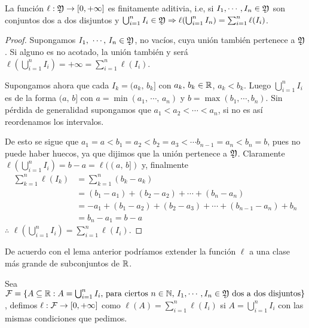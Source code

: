 \begin{lemma}
    La función $\ell : \mathfrak{Y} \to [0, +\infty]$ es finitamente aditivia, i.e, si $I_1, \cdots, I_n \in \mathfrak{Y}$ son conjuntos dos a dos disjuntos y
    $\bigcup_{i = 1}^n I_i \in \mathfrak{Y} \Rightarrow \ell(\bigcup_{i = 1}^n I_n) = \sum_{i = 1}^n \ell(I_i)$.
    \begin{proof}
        Supongamos $I_1\text{, } \cdots \text{, } I_n \in \mathfrak{Y}$, no vacíos, cuya unión también pertenece a $\mathfrak{Y}$.
        Si alguno es no acotado, la unión también y será $\ell(\bigcup_{i = 1}^n I_i) = +\infty = \sum_{i = 1}^n \ell(I_i)$.

        Supongamos ahora que cada $I_k = (a_k\text{, } b_k]$ con $a_k\text{, } b_k \in \mathbb{R}$, $a_k < b_k$.
        Luego $\bigcup_{i = 1}^n I_i$ es de la forma $(a \text{, } b]$ con $a = \min(a_1\text{, } \cdots \text{, } a_n)$ y $b = \max(b_1, \cdots, b_n)$.
        Sin pérdida de generalidad supongamos que $a_1 < a_2 < \cdots < a_n$, si no es así reordenamos los intervalos.

        De esto se sigue que $a_1 = a < b_1 = a_2 < b_2 = a_3 < \cdots b_{n - 1} = a_n < b_n = b$, pues no puede haber huecos, ya que dijimos que la unión pertenece a $\mathfrak{Y}$.
        Claramente $\ell(\bigcup_{i = 1}^n I_i) = b - a = \ell((a\text{, } b])$ y, finalmente \begin{align*}
            \sum_{k = 1}^n \ell(I_k) & = \sum_{k = 1}^n (b_k - a_k)                                          \\
                                     & = (b_1 - a_1) + (b_2 - a_2) + \cdots + (b_n - a_n)                    \\
                                     & = -a_1 + (b_1 - a_2) + (b_2 - a_3) + \cdots + (b_{n - 1} - a_n) + b_n \\
                                     & = b_n - a_1 = b - a
        \end{align*}
        $\therefore$ $\ell(\bigcup_{i = 1}^n I_i) = \sum_{i = 1}^n \ell(I_i)$.
    \end{proof}
\end{lemma}

De acuerdo con el lema anterior podríamos extender la función $\ell$ a una clase más grande de subconjuntos de $\mathbb{R}$.

Sea $\mathcal{F} = \{ A \subseteq \mathbb{R} : A = \bigcup_{i = 1}^n I_i \text{, para ciertos } n \in \mathbb{N} \text{, } I_1, \cdots, I_n \in \mathfrak{Y} \text{ dos a dos disjuntos} \}$,
defimos $\ell : \mathcal{F} \to [0, +\infty]$ como $\ell(A) = \sum_{i = 1}^n \ell(I_i)$ si $A = \bigcup_{i = 1}^n I_i$ con las mismas condiciones que pedimos.

